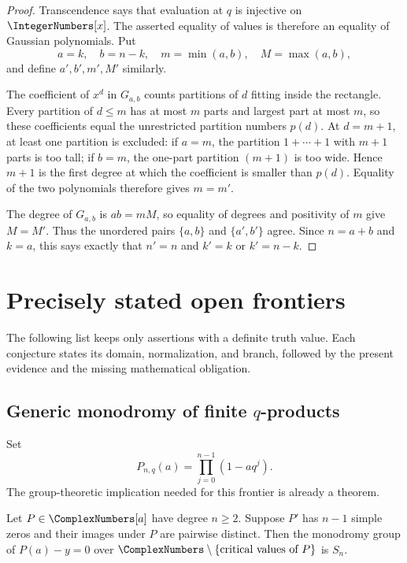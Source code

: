 \begin{proof}
Transcendence says that evaluation at \(q\) is injective on
\(\IntegerNumbers[x]\).  The asserted equality of values is therefore an equality of
Gaussian polynomials.  Put
\[
 a=k,\quad b=n-k,\quad
 m=\min(a,b),\quad M=\max(a,b),
\]
and define \(a',b',m',M'\) similarly.

The coefficient of \(x^d\) in \(G_{a,b}\) counts partitions of \(d\) fitting
inside the rectangle.  Every partition of \(d\le m\) has at most \(m\) parts
and largest part at most \(m\), so these coefficients equal the unrestricted
partition numbers \(p(d)\).  At \(d=m+1\), at least one partition is excluded:
if \(a=m\), the partition \(1+\cdots+1\) with \(m+1\) parts is too tall; if
\(b=m\), the one-part partition \((m+1)\) is too wide.  Hence \(m+1\) is the
first degree at which the coefficient is smaller than \(p(d)\).  Equality of
the two polynomials therefore gives \(m=m'\).

The degree of \(G_{a,b}\) is \(ab=mM\), so equality of degrees and positivity
of \(m\) give \(M=M'\).  Thus the unordered pairs
\(\{a,b\}\) and \(\{a',b'\}\) agree.  Since \(n=a+b\) and \(k=a\), this says
exactly that \(n'=n\) and \(k'=k\) or \(k'=n-k\).
\end{proof}

\section{Precisely stated open frontiers}
\label{sec:precise-open-frontiers}

The following list keeps only assertions with a definite truth value.  Each
conjecture states its domain, normalization, and branch, followed by the
present evidence and the missing mathematical obligation.

\subsection{\texorpdfstring{Generic monodromy of finite \(q\)-products}{Generic monodromy of finite q-products}}

Set
\[
 P_{n,q}(a)=\prod_{j=0}^{n-1}(1-aq^j).
\]
The group-theoretic implication needed for this frontier is already a
theorem.

\begin{theorem}
\label{thm:simple-critical-values-monodromy}
Let \(P\in\ComplexNumbers[a]\) have degree \(n\ge2\).  Suppose \(P'\) has \(n-1\)
simple zeros and their images under \(P\) are pairwise distinct.  Then the
monodromy group of \(P(a)-y=0\) over
\(\ComplexNumbers\setminus\{\text{critical values of }P\}\) is \(S_n\).
\end{theorem}

